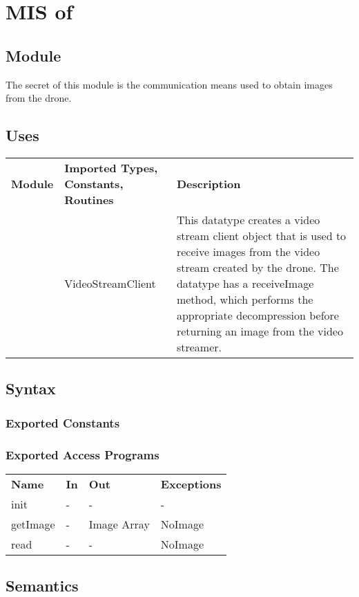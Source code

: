\documentclass[12pt, titlepage]{article}
\begin{document}
\section{MIS of } \label{MIS_OPERATOR_CAMERA} 
\subsection{Module}
The secret of this module is the communication means used to obtain images from the drone.
\subsection{Uses}
\begin{center}
\begin{tabular}{p{2 cm} p{5cm} p{6.5cm} } 
\hline
\textbf{Module} & \textbf{Imported Types, Constants, Routines} & \textbf{Description} \\
\nameref{GStreamer} & VideoStreamClient & This datatype creates a video stream client object that is used to receive images from the video stream created by the drone. The datatype has a receiveImage method, which performs the appropriate decompression before returning an image from the video streamer. \\
\hline
\hline
\end{tabular}
\end{center}
\subsection{Syntax}
\subsubsection{Exported Constants}
\subsubsection{Exported Access Programs}
\begin{center}
\begin{tabular}{p{3.5cm} p{2.5cm} p{2.5cm} p{5cm}} 
\hline
\textbf{Name} & \textbf{In} & \textbf{Out} & \textbf{Exceptions} \\
init & - & - & - \\
getImage & - & Image Array & NoImage \\
read & - & - & NoImage \\
\hline
\hline
\end{tabular}
\end{center}
\subsection{Semantics}
\end{document}

